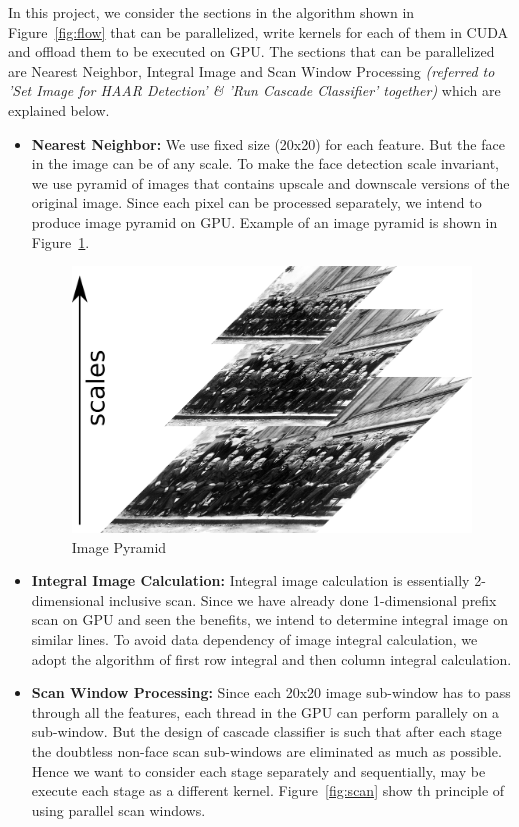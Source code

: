 In this project, we consider the sections in the algorithm shown in
Figure~\ref{fig:flow} that
can be parallelized, write kernels for each of them in CUDA
and offload them to be executed on GPU. The sections that
can be parallelized are Nearest Neighbor, Integral Image and Scan Window Processing
\textit{(referred to 'Set Image for HAAR Detection' \& 'Run Cascade Classifier' together)}
 which are explained below.
\vspace{0.1in}
\begin{itemize}

\item \textbf{Nearest Neighbor:}
We use fixed size (20x20) for each feature. But the face in the image can be of any scale. 
To make the face detection scale  invariant, we use pyramid of images that contains upscale and
downscale versions of the original image. Since each pixel can be processed separately, 
we intend to produce image pyramid on GPU. Example of an image pyramid is shown in Figure~\ref{fig:scale}.

\begin{figure}[h]
  \centering
  \includegraphics[width=0.65\linewidth]{figs/scale.jpg}
  \vspace{0.05in}
  \caption{Image Pyramid \textnormal{\small }  }
  \label{fig:scale}
\end{figure}


\item \textbf{Integral Image Calculation:}
Integral image calculation is essentially 2-dimensional inclusive scan. Since we have already done 
1-dimensional prefix scan on GPU and seen the benefits, we intend to determine integral image on 
similar lines.
To avoid data dependency of image integral calculation, we adopt the algorithm of first 
row integral and then column integral calculation.

\vspace{0.1in}
\item \textbf{Scan Window Processing:}
Since each 20x20 image sub-window has to pass through all the features, each thread in the GPU 
can perform parallely on a sub-window. But the design of cascade classifier is such that after 
each stage the doubtless non-face scan sub-windows are eliminated as much as possible. Hence we 
want to consider each stage separately and sequentially, may be execute each stage as a different kernel.
Figure~\ref{fig:scan} show th principle of using parallel scan windows. 


\end{itemize}
